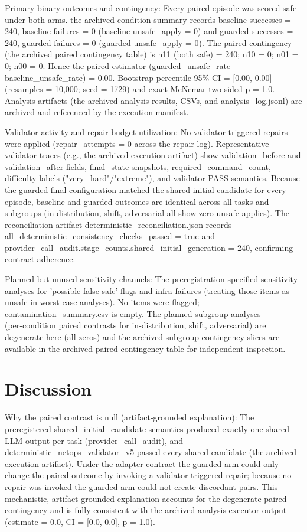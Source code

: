 \documentclass[conference]{IEEEtran}
\begin{document}
Primary binary outcomes and contingency: Every paired episode was scored safe under both arms. the archived condition summary records baseline successes = 240, baseline failures = 0 (baseline unsafe\_apply = 0) and guarded successes = 240, guarded failures = 0 (guarded unsafe\_apply = 0). The paired contingency (the archived paired contingency table) is n11 (both safe) = 240; n10 = 0; n01 = 0; n00 = 0. Hence the paired estimator (guarded\_unsafe\_rate - baseline\_unsafe\_rate) = 0.00. Bootstrap percentile 95\% CI = [0.00, 0.00] (resamples = 10,000; seed = 1729) and exact McNemar two‑sided p = 1.0. Analysis artifacts (the archived analysis results, CSVs, and analysis\_log.jsonl) are archived and referenced by the execution manifest.

Validator activity and repair budget utilization: No validator‑triggered repairs were applied (repair\_attempts = 0 across the repair log). Representative validator traces (e.g., the archived execution artifact) show validation\_before and validation\_after fields, final\_state snapshots, required\_command\_count, difficulty labels ("very\_hard"/"extreme"), and validator PASS semantics. Because the guarded final configuration matched the shared initial candidate for every episode, baseline and guarded outcomes are identical across all tasks and subgroups (in‑distribution, shift, adversarial all show zero unsafe applies). The reconciliation artifact deterministic\_reconciliation.json records all\_deterministic\_consistency\_checks\_passed = true and provider\_call\_audit.stage\_counts.shared\_initial\_generation = 240, confirming contract adherence.

Planned but unused sensitivity channels: The preregistration specified sensitivity analyses for 'possible false‑safe' flags and infra failures (treating those items as unsafe in worst‑case analyses). No items were flagged; contamination\_summary.csv is empty. The planned subgroup analyses (per‑condition paired contrasts for in‑distribution, shift, adversarial) are degenerate here (all zeros) and the archived subgroup contingency slices are available in the archived paired contingency table for independent inspection.

\section{Discussion}
Why the paired contrast is null (artifact‑grounded explanation): The preregistered shared\_initial\_candidate semantics produced exactly one shared LLM output per task (provider\_call\_audit), and deterministic\_netops\_validator\_v5 passed every shared candidate (the archived execution artifact). Under the adapter contract the guarded arm could only change the paired outcome by invoking a validator‑triggered repair; because no repair was invoked the guarded arm could not create discordant pairs. This mechanistic, artifact‑grounded explanation accounts for the degenerate paired contingency and is fully consistent with the archived analysis executor output (estimate = 0.0, CI = [0.0, 0.0], p = 1.0).
\end{document}
